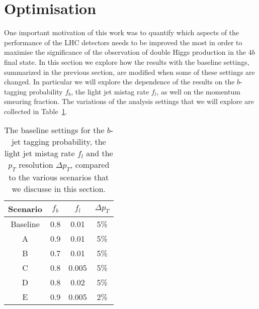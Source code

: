 
\section{Optimisation}
\label{sec:optimisation}

One important motivation of this work was to quantify which aspects
of the performance of the LHC detectors needs to be improved
the most in order to maximise the significance of the observation
of double Higgs production in the $4b$ final state.
%
In this section we explore how the results with the baseline settings,
summarized in the previous section, are modified when some of
these settings are changed.
%
In particular we will explore the dependence of the results on
the $b$-tagging probability $f_b$, the light jet mistag rate
$f_l$, as well on the momentum smearing fraction.
%
The variations of the analysis
settings that we will explore are collected in
Table~\ref{sec:variations}.

\begin{table}[h]
  \centering
  \begin{tabular}{|c|c|c|c|}
\hline
    Scenario  &  $f_b$  &  $f_l$  &  $\Delta p_T$ \\
    \hline
    \hline
    Baseline  &  0.8   &   0.01  &  5\% \\
    \hline
    A        &  0.9   &   0.01  &  5\% \\
    B        &  0.7   &   0.01  &  5\% \\
    C        &  0.8   &   0.005  &  5\% \\
    D        &  0.8   &   0.02  &  5\% \\
    E        &  0.9   &   0.005  &  2\% \\   
    \hline
  \end{tabular}
  \caption{\small The baseline settings for the $b$-jet
    tagging probability, the light jet mistag rate $f_l$
    and the $p_T$ resolution $\Delta p_T$, compared
    to the various scenarios that we discusse in this section.
\label{sec:variations}
  }
  \end{table}
